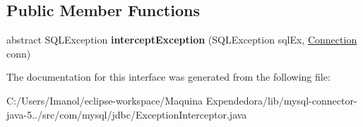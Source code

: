 \subsection*{Public Member Functions}
\begin{DoxyCompactItemize}
\item 
\mbox{\label{interfacecom_1_1mysql_1_1jdbc_1_1_exception_interceptor_a252e5c5a88596404dd4944ed1e026503}} 
abstract S\+Q\+L\+Exception {\bfseries intercept\+Exception} (S\+Q\+L\+Exception sql\+Ex, \mbox{\hyperlink{interfacecom_1_1mysql_1_1jdbc_1_1_connection}{Connection}} conn)
\end{DoxyCompactItemize}


The documentation for this interface was generated from the following file\+:\begin{DoxyCompactItemize}
\item 
C\+:/\+Users/\+Imanol/eclipse-\/workspace/\+Maquina Expendedora/lib/mysql-\/connector-\/java-\/5../src/com/mysql/jdbc/Exception\+Interceptor.\+java\end{DoxyCompactItemize}
